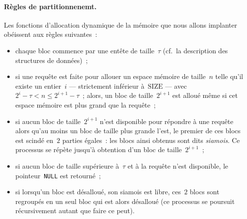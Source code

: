 \paragraph{R\`egles de partitionnenemt.}
Les fonctions d'allocation dynamique de la m\'emoire que nous allons
implanter ob\'eissent aux r\`egles suivantes~:
\begin{itemize}
\item chaque bloc commence par une ent\^ete de taille~$\tau$ (cf.\ la
  description des structures de donn\'ees)~;
\item si une requ\^ete est faite pour allouer un espace m\'emoire de
  taille~$n$ telle qu'il existe un entier~$i$ --- strictement
  inf\'erieur \`a~$\mathrm{SIZE}$ --- avec~$2^i-\tau< n \leq
  2^{i+1}-\tau$~; alors, un bloc de taille~$2^{i+1}$ est allou\'e
  m\^eme si cet espace m\'emoire est plus grand que la requ\^ete~;
\item si aucun bloc de taille~$2^{i+1}$ n'est disponible pour
  r\'epondre \`a une requ\^ete alors qu'au moins un bloc de taille
  plus grande l'est, le premier de ces blocs est scind\'e en~$2$
  parties \'egales~: les blocs ainsi obtenus sont dits
  \textit{siamois}. Ce processus se r\'ep\`ete jusqu'\`a obtention
  d'un bloc de taille~$2^{i+1}$~;
\item si aucun bloc de taille sup\'erieure \`a~$\tau$ et \`a la
  requ\^ete n'est disponible, le pointeur~\verb+NULL+ est retourn\'e~;
\item si lorsqu'un bloc est d\'esallou\'e, son siamois est libre,
  ces~$2$ blocs sont regroup\'es en un seul bloc qui est alors
  d\'esallou\'e (ce processus se poursuit r\'ecursivement autant que
  faire ce peut).
\end{itemize}


